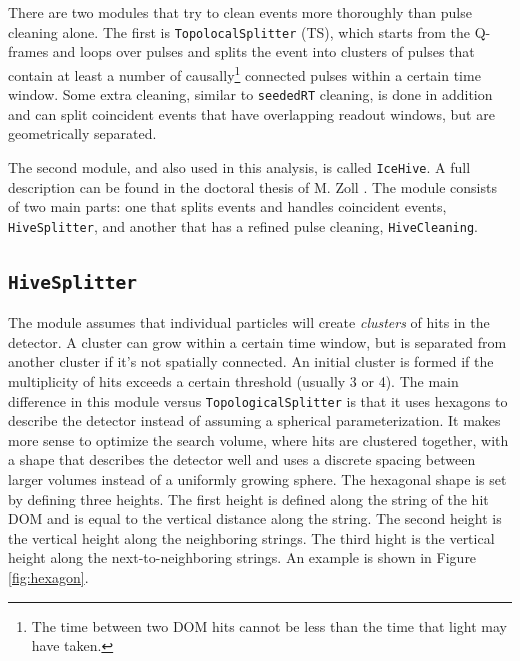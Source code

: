 \noindent There are two modules that try to clean events more thoroughly than pulse cleaning alone. The first is \texttt{TopolocalSplitter} (TS), which starts from the Q-frames and loops over pulses and splits the event into clusters of pulses that contain at least a number of causally\footnote{The time between two DOM hits cannot be less than the time that light may have taken.} connected pulses within a certain time window. Some extra cleaning, similar to \texttt{seededRT} cleaning, is done in addition and can split coincident events that have overlapping readout windows, but are geometrically separated.

The second module, and also used in this analysis, is called \texttt{IceHive}. A full description can be found in the doctoral thesis of M. Zoll \cite{mzollthesis}. The module consists of two main parts: one that splits events and handles coincident events, \texttt{HiveSplitter}, and another that has a refined pulse cleaning, \texttt{HiveCleaning}.

\subsection{\texttt{HiveSplitter}}
The module assumes that individual particles will create \textit{clusters} of hits in the detector. A cluster can grow within a certain time window, but is separated from another cluster if it's not spatially connected. An initial cluster is formed if the multiplicity of hits exceeds a certain threshold (usually 3 or 4). The main difference in this module versus \texttt{TopologicalSplitter} is that it uses hexagons to describe the detector instead of assuming a spherical parameterization. It makes more sense to optimize the search volume, where hits are clustered together, with a shape that describes the detector well and uses a discrete spacing between larger volumes instead of a uniformly growing sphere. The hexagonal shape is set by defining three heights. The first height is defined along the string of the hit DOM and is equal to the vertical distance along the string. The second height is the vertical height along the neighboring strings. The third hight is the vertical height along the next-to-neighboring strings. An example is shown in Figure \ref{fig:hexagon}.

